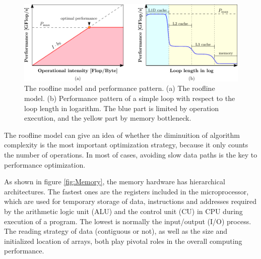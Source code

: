 \begin{figure}[h]
\begin{centering}
\includegraphics[width=1\columnwidth]{_figure/roofline}
\par\end{centering}

\caption [The roofline model and performance pattern]{The roofline model and performance pattern. (a) The roofline model.
(b) Performance pattern of a simple loop with respect to the loop
length in logarithm. The blue part is limited by operation execution,
and the yellow part by memory bottleneck. \label{fig:The-roofline-model}}
\end{figure}


The roofline model can give an idea of whether the diminuition of algorithm
complexity is the most important optimization strategy, because it
only counts the number of operations. In most of cases, avoiding
slow data paths is the key to performance optimization.

As shown in figure \ref{fig:Memory}, the memory hardware has hierarchical
architectures. The fastest ones are the registers included in the
microprocessor, which are used for temporary storage of data, instructions
and addresses required by the arithmetic logic unit (ALU) and the
control unit (CU) in CPU during execution of a program. The lowest
is normally the input/output (I/O) process. The reading strategy of
data (contiguous or not), as well as the size and initialized location of arrays,
both play pivotal roles in the overall computing performance. 

